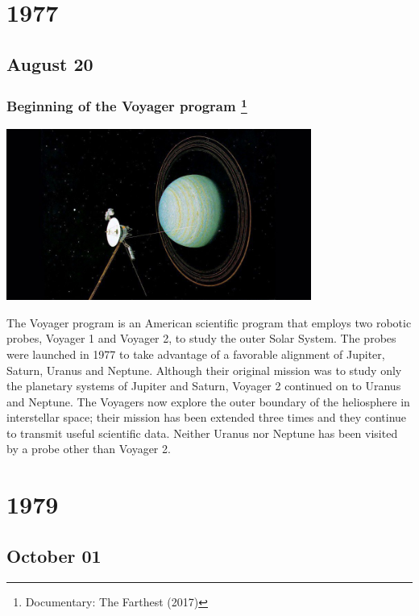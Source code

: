 \documentclass[11pt]{report}
\begin{document}
\chapter{1977}
\section{August 20}
\subsection{Beginning of the Voyager program \protect\footnote{Documentary: The Farthest (2017)}}
\vspace{2mm}\begin{center}\includegraphics[width=10cm]{./img/voyagerProgram.jpg}\end{center}
The Voyager program is an American scientific program that employs two robotic probes, Voyager 1 and Voyager 2, to study the outer Solar System. The probes were launched in 1977 to take advantage of a favorable alignment of Jupiter, Saturn, Uranus and Neptune. Although their original mission was to study only the planetary systems of Jupiter and Saturn, Voyager 2 continued on to Uranus and Neptune. The Voyagers now explore the outer boundary of the heliosphere in interstellar space; their mission has been extended three times and they continue to transmit useful scientific data. Neither Uranus nor Neptune has been visited by a probe other than Voyager 2.

\chapter{1979}
\section{October 01}
\end{document}
